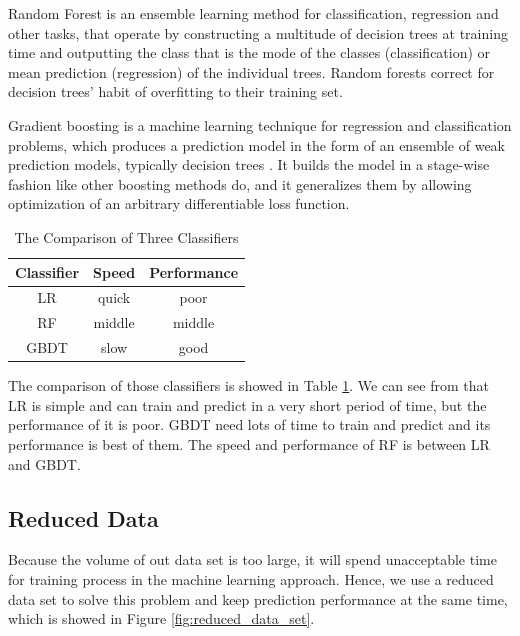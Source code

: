 \documentclass{llncs}
\begin{document}
Random Forest \cite{breiman2001random} is an ensemble learning method
for classification, regression and other tasks,
that operate by constructing a multitude of decision trees at training time and
outputting the class that is the mode of the classes (classification)
or mean prediction (regression) of the individual trees.
Random forests correct for decision trees' habit of overfitting to their training set.

Gradient boosting is a machine learning technique for regression and classification problems,
which produces a prediction model in the form of an ensemble of weak prediction models,
typically decision trees \cite{friedman2003multiple}.
It builds the model in a stage-wise fashion like other boosting methods do,
and it generalizes them by allowing optimization of an arbitrary differentiable loss function.

\begin{table}[htbp]
	\normalsize
	\centering
	\caption{The Comparison of Three Classifiers}
	\begin{tabular}{|c|c|c|}
		\hline
		\textbf{Classifier} & \textbf{Speed} & \textbf{Performance} \\
		\hline
		LR & quick & poor \\
		\hline
		RF & middle & middle \\
		\hline
		GBDT & slow & good \\
		\hline
	\end{tabular}
	\label{tab:comparison}
\end{table}

The comparison of those classifiers is showed in Table \ref{tab:comparison}.
We can see from that LR is simple and can train and predict in a very short period of time,
but the performance of it is poor.
GBDT need lots of time to train and predict and its performance is best of them.
The speed and performance of RF is between LR and GBDT. 

\subsection{Reduced Data}
Because the volume of out data set is too large,
it will spend unacceptable time for training process
in the machine learning approach.
Hence, we use a reduced data set to solve this problem
and keep prediction performance at the same time,
which is showed in Figure \ref{fig:reduced_data_set}.
\end{document}

